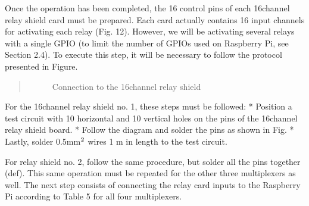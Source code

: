 \documentclass[letterpaper,10pt,english]{sphinxmanual}
\let\sphinxpxdimen\pdfpxdimen\else\newdimen\sphinxpxdimen
\begin{document}
\sphinxAtStartPar
Once the operation has been completed, the 16 control pins of each 16\sphinxhyphen{}channel relay shield card must be prepared. Each card actually contains 16 input channels
for activating each relay (Fig. 12). However, we will be activating several relays with a single GPIO (to limit the number of GPIOs used on Raspberry Pi,
see Section 2.4). To execute this step, it will be necessary to follow the protocol presented in Figure.
\begin{quote}

\begin{figure}[htbp]
\centering
\capstart

\noindent\sphinxincludegraphics[width=800\sphinxpxdimen,height=400\sphinxpxdimen]{{connection}.jpg}
\caption{Connection to the 16\sphinxhyphen{}channel relay shield}\label{\detokenize{V2_00:id7}}\end{figure}
\end{quote}

\sphinxAtStartPar
For the 16\sphinxhyphen{}channel relay shield no. 1, these steps must be followed:
*       Position a test circuit with 10 horizontal and 10 vertical holes on the pins of the 16\sphinxhyphen{}channel relay shield board.
*       Follow the diagram and solder the pins as shown in Fig.
*       Lastly, solder 0.5\sphinxhyphen{}mm\(\sp{\text{2}}\) wires 1 m in length to the test circuit.

\sphinxAtStartPar
For relay shield no. 2, follow the same procedure, but solder all the pins together (d\sphinxhyphen{}e\sphinxhyphen{}f).
This same operation must be repeated for the other three multiplexers as well.
The next step consists of connecting the relay card inputs to the Raspberry Pi according to Table 5 for all four multiplexers.
\end{document}
